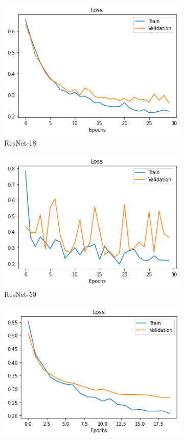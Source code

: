\documentclass{article}
\begin{document}
\begin{figure}[H]
    \centering
    \begin{subfigure}[b]{0.30\textwidth}
            \centering
            \includegraphics[width=.85\linewidth]{images/resnet18_loss}
            \caption{ResNet-18}
            \label{ResNet-18}
    \end{subfigure}%
    \begin{subfigure}[b]{0.30\textwidth}
            \centering
            \includegraphics[width=.85\linewidth]{images/resnset50_loss}
            \caption{ResNet-50}
            \label{ResNet-50}
    \end{subfigure}%
    \begin{subfigure}[b]{0.30\textwidth}
            \centering
            \includegraphics[width=.85\linewidth]{images/densenet121_loss}

\end{subfigure}
\end{figure}
\end{document}
